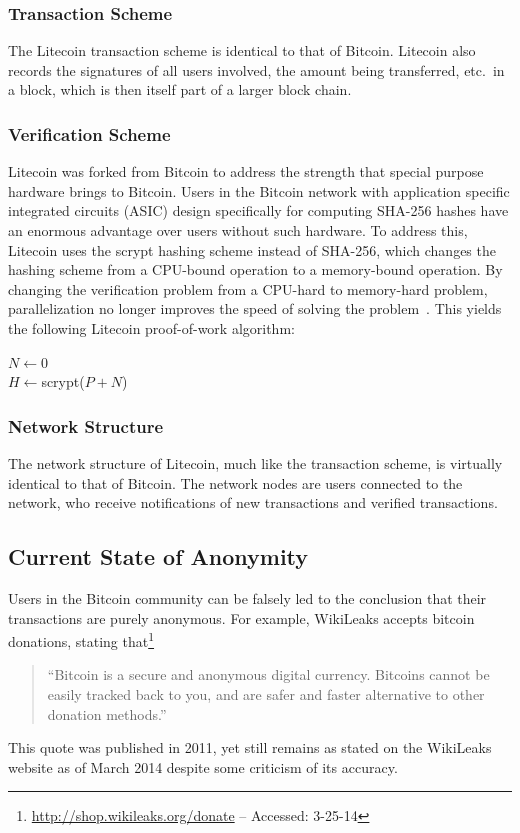 \documentclass[11pt]{article}
\begin{document}
\subsubsection{Transaction Scheme}
The Litecoin transaction scheme is identical to that of
Bitcoin. Litecoin also records the signatures of all users involved, the amount
being transferred, etc.\ in a block, which is then itself part of a larger block
chain.

\subsubsection{Verification Scheme}
Litecoin was forked from Bitcoin to address the strength that special purpose
hardware brings to Bitcoin. Users in the Bitcoin network with application
specific integrated circuits (ASIC) design specifically for computing SHA-256
hashes have an enormous advantage over users without such hardware. To address
this, Litecoin uses the scrypt hashing scheme instead of SHA-256, which changes
the hashing scheme from a CPU-bound operation to a memory-bound operation. By
changing the verification problem from a CPU-hard to memory-hard problem,
parallelization no longer improves the speed of solving the
problem~\cite{percival09}. This yields the following Litecoin proof-of-work
algorithm:
\begin{algorithm}
    $N \gets 0$\\
    $H \gets ${\sc scrypt($P + N$)}\\
\end{algorithm}

\subsubsection{Network Structure}
The network structure of Litecoin, much like the transaction scheme, is
virtually identical to that of Bitcoin. The network nodes are users connected to
the network, who receive notifications of new transactions and verified
transactions.

\subsection{Current State of Anonymity}
Users in the Bitcoin community can be falsely led to the conclusion that their
transactions are purely anonymous. For example, WikiLeaks accepts bitcoin
donations, stating that\footnote{\url{http://shop.wikileaks.org/donate} --
Accessed: 3-25-14}
\begin{quote}
``Bitcoin is a secure and anonymous digital currency. Bitcoins cannot be easily
tracked back to you, and are safer and faster alternative to other donation
methods.''
\end{quote}
This quote was published in 2011, yet still remains as stated on the WikiLeaks
website as of March 2014 despite some criticism of its accuracy.
\end{document}
